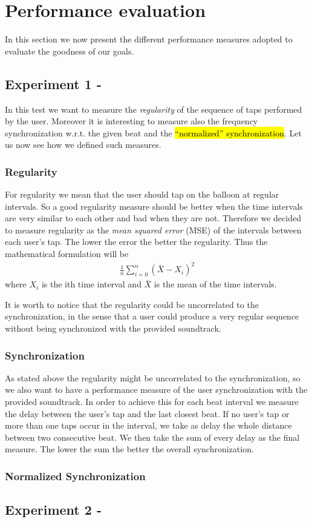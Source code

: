 \section*{Performance evaluation}
In this section we now present the different performance measures adopted to evaluate the goodness of our goals.

\subsection*{Experiment 1 - \testfirst}
In this test we want to measure the \emph{regularity} of the sequence of taps performed by the user. Moreover it is interesting to measure also the frequency synchronization w.r.t. the given beat and the \hl{``normalized'' synchronization}. 
Let us now see how we defined such measures.
\subsubsection*{Regularity}
For regularity we mean that the user should tap on the balloon at regular intervals. So a good regularity measure should be better when the time intervals are very similar to each other and bad when they are not. Therefore we decided to measure regularity as the \emph{mean squared error} (MSE) of the intervals between each user's tap.
The lower the error the better the regularity.
Thus the mathematical formulation will be
\begin{align}
	\frac{1}{n}\displaystyle\sum\limits_{i=0}^n(\bar{X}-X_i)^2
\end{align}
where $X_i$ is the ith time interval and $\bar{X}$ is the mean of the time intervals.

It is worth to notice that the regularity could be uncorrelated to the synchronization, in the sense that a user could produce a very regular sequence without being synchronized with the provided soundtrack.

\subsubsection*{Synchronization}
As stated above the regularity might be uncorrelated to the synchronization, so we also want to have a performance measure of the user synchronization with the provided soundtrack.
In order to achieve this for each beat interval we measure the delay between the user's tap and the last closest beat.
If no user's tap or more than one taps occur in the interval, we take as delay the whole distance between two consecutive beat.
We then take the sum of every delay as the final measure.
The lower the sum the better the overall synchronization.


\subsubsection*{Normalized Synchronization}

\subsection*{Experiment 2 - \testsecond}